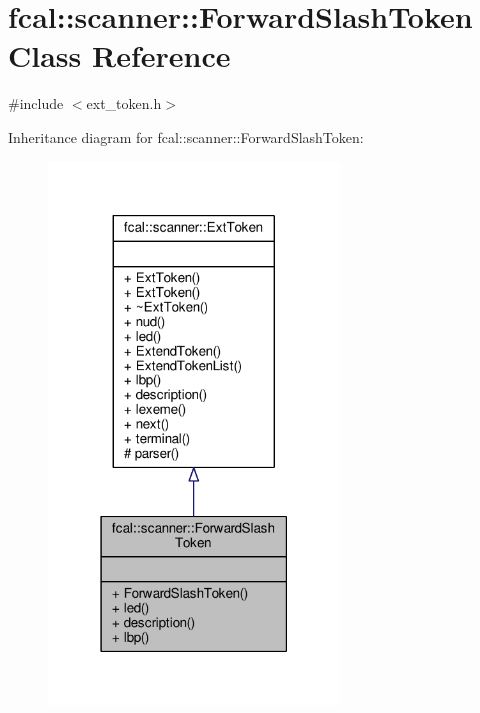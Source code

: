 \hypertarget{classfcal_1_1scanner_1_1ForwardSlashToken}{}\section{fcal\+:\+:scanner\+:\+:Forward\+Slash\+Token Class Reference}
\label{classfcal_1_1scanner_1_1ForwardSlashToken}


{\ttfamily \#include $<$ext\+\_\+token.\+h$>$}



Inheritance diagram for fcal\+:\+:scanner\+:\+:Forward\+Slash\+Token\+:
\nopagebreak
\begin{figure}[H]
\begin{center}
\leavevmode
\includegraphics[width=219pt]{classfcal_1_1scanner_1_1ForwardSlashToken__inherit__graph}
\end{center}
\end{figure}


